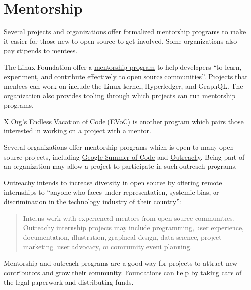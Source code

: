 


\chapter{Mentorship}

Several projects and organizations offer formalized mentorship programs to make it easier for those new to open source to get involved.  Some organizations also pay stipends to mentees.

The Linux Foundation offer a \href{https://www.linuxfoundation.org/en/about/diversity-inclusivity/mentorship/}{mentorship program} to help developers ``to learn, experiment, and contribute effectively to open source communities''.  Projects that mentees can work on include the Linux kernel, Hyperledger, and GraphQL.  The organization also provides \href{https://lfx.linuxfoundation.org/tools/mentorship}{tooling} through which projects can run mentorship programs.

X.Org's \href{https://www.x.org/wiki/XorgEVoC/}{Endless Vacation of Code (EVoC)} is another program which pairs those interested in working on a project with a mentor.

Several organizations offer mentorship programs which is open to many open-source projects, including \href{https://summerofcode.withgoogle.com/}{Google Summer of Code} and \href{https://www.outreachy.org/}{Outreachy}.  Being part of an organization may allow a project to participate in such outreach programs.

\begin{kaobox}[frametitle=Outreachy: increasing diversity in open source]

\href{https://www.outreachy.org/}{Outreachy} intends to increase diversity in open source by offering remote internships to ``anyone who faces under-representation, systemic bias, or discrimination in the technology industry of their country'':

\begin{quote}

Interns work with experienced mentors from open source communities. Outreachy internship projects may include programming, user experience, documentation, illustration, graphical design,  data science, project marketing, user advocacy, or community event planning.

\end{quote}

\end{kaobox}

Mentorship and outreach programs are a good way for projects to attract new contributors and grow their community.  Foundations can help by taking care of the legal paperwork and distributing funds.

